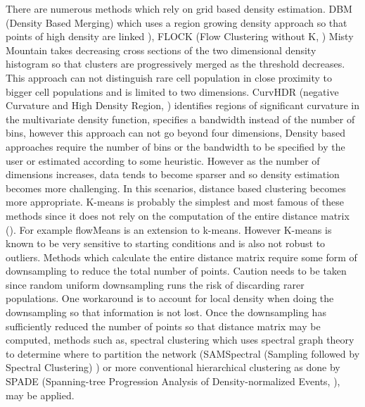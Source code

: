 There are numerous methods which rely on grid based density estimation.
DBM (Density Based Merging) which uses a region growing density approach so that points of high density are linked \cite{Walther:2009gn}),
FLOCK (Flow Clustering without K, \cite{Qian:2010ep}) 
Misty Mountain \citep{Sugar:2010jf} takes decreasing cross sections of the two dimensional density histogram so that clusters are progressively merged as the threshold decreases.
This approach can not distinguish rare cell population in close proximity to bigger cell populations and is limited to two dimensions.
CurvHDR (negative Curvature and High Density Region, \citet{Naumann:2010fp}) identifies regions of significant curvature in the multivariate density function,
specifies a bandwidth
instead of the number of bins, however this approach can not go beyond four dimensions,
Density based approaches require the number of bins or the bandwidth to be specified by the user or estimated according to some heuristic.  
However as the number of dimensions increases, data tends to become sparser and so density estimation becomes more challenging.
In this scenarios, distance based clustering becomes more appropriate.
K-means is probably the simplest and most famous of these methods
since it does not rely on the computation of the entire distance matrix ().
For example flowMeans \citep{Aghaeepour:2010fv} is an extension to k-means.
However K-means is known to be very sensitive to starting conditions and is also not robust to outliers.
Methods which calculate the entire distance matrix require some form of downsampling to reduce the total number of points.
Caution needs to be taken since random uniform downsampling runs the risk of discarding rarer populations.
One workaround is to account for local density when doing the downsampling so that information is not lost.
Once the downsampling has sufficiently reduced the number of points so that distance matrix may be computed,
methods such as, spectral clustering which uses spectral graph theory to determine where to partition the network
(SAMSpectral (Sampling followed by Spectral Clustering) \citet{Zare:2010cw}) or more conventional hierarchical clustering
as done by SPADE (Spanning-tree Progression Analysis of Density-normalized Events, \cite{Simonds:2011jh}), may be applied.

